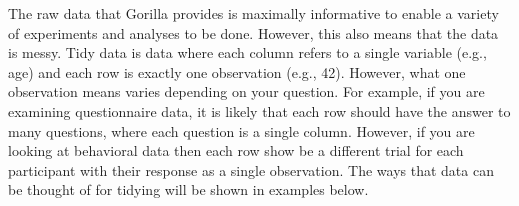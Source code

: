 The raw data that Gorilla provides is maximally informative to enable a variety of experiments and analyses to be done. However, this also means that the data is messy. Tidy data is data where each column refers to a single variable (e.g., age) and each row is exactly one observation (e.g., 42). However, what one observation means varies depending on your question. For example, if you are examining questionnaire data, it is likely that each row should have the answer to many questions, where each question is a single column. However, if you are looking at behavioral data then each row show be a different trial for each participant with their response as a single observation. The ways that data can be thought of for tidying will be shown in examples below.



